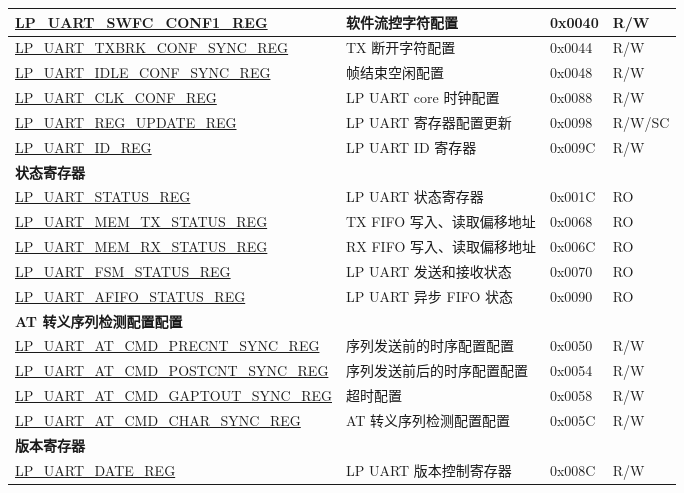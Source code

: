 \begin{longtable}{ | p{6.8cm} | p{5.7cm} | p{1.3cm} | p{1.7cm} | }
\hyperref[regdesc:LPUARTSWFCCONF1REG]{LP\_UART\_SWFC\_CONF1\_REG} & 软件流控字符配置 & 0x0040 & R/W \\ \hline
\hyperref[regdesc:LPUARTTXBRKCONFSYNCREG]{LP\_UART\_TXBRK\_CONF\_SYNC\_REG} & TX 断开字符配置 & 0x0044 & R/W \\ \hline
\hyperref[regdesc:LPUARTIDLECONFSYNCREG]{LP\_UART\_IDLE\_CONF\_SYNC\_REG} & 帧结束空闲配置 & 0x0048 & R/W \\ \hline
\hyperref[regdesc:LPUARTCLKCONFREG]{LP\_UART\_CLK\_CONF\_REG} & LP UART core 时钟配置 & 0x0088 & R/W \\ \hline
\hyperref[regdesc:LPUARTREGUPDATEREG]{LP\_UART\_REG\_UPDATE\_REG} & LP UART 寄存器配置更新 & 0x0098 & R/W/SC \\ \hline
\hyperref[regdesc:LPUARTIDREG]{LP\_UART\_ID\_REG} & LP UART ID 寄存器 & 0x009C & R/W \\ \hline
\multicolumn{4}{|l|}{\textbf{状态寄存器}} \\ \hline
\hyperref[regdesc:LPUARTSTATUSREG]{LP\_UART\_STATUS\_REG} & LP UART 状态寄存器 & 0x001C & RO \\ \hline
\hyperref[regdesc:LPUARTMEMTXSTATUSREG]{LP\_UART\_MEM\_TX\_STATUS\_REG} & TX FIFO 写入、读取偏移地址 & 0x0068 & RO \\ \hline
\hyperref[regdesc:LPUARTMEMRXSTATUSREG]{LP\_UART\_MEM\_RX\_STATUS\_REG} & RX FIFO 写入、读取偏移地址 & 0x006C & RO \\ \hline
\hyperref[regdesc:LPUARTFSMSTATUSREG]{LP\_UART\_FSM\_STATUS\_REG} & LP UART 发送和接收状态 & 0x0070 & RO \\ \hline
\hyperref[regdesc:LPUARTAFIFOSTATUSREG]{LP\_UART\_AFIFO\_STATUS\_REG} & LP UART 异步 FIFO 状态 & 0x0090 & RO \\ \hline
\multicolumn{4}{|l|}{\textbf{AT 转义序列检测配置配置}} \\ \hline
\hyperref[regdesc:LPUARTATCMDPRECNTSYNCREG]{LP\_UART\_AT\_CMD\_PRECNT\_SYNC\_REG} & 序列发送前的时序配置配置 & 0x0050 & R/W \\ \hline
\hyperref[regdesc:LPUARTATCMDPOSTCNTSYNCREG]{LP\_UART\_AT\_CMD\_POSTCNT\_SYNC\_REG} & 序列发送前后的时序配置配置 & 0x0054 & R/W \\ \hline
\hyperref[regdesc:LPUARTATCMDGAPTOUTSYNCREG]{LP\_UART\_AT\_CMD\_GAPTOUT\_SYNC\_REG} & 超时配置 & 0x0058 & R/W \\ \hline
\hyperref[regdesc:LPUARTATCMDCHARSYNCREG]{LP\_UART\_AT\_CMD\_CHAR\_SYNC\_REG} & AT 转义序列检测配置配置 & 0x005C & R/W \\ \hline
\multicolumn{4}{|l|}{\textbf{版本寄存器}} \\ \hline
\hyperref[regdesc:LPUARTDATEREG]{LP\_UART\_DATE\_REG} & LP UART 版本控制寄存器 & 0x008C & R/W \\ \hline

\end{longtable}
